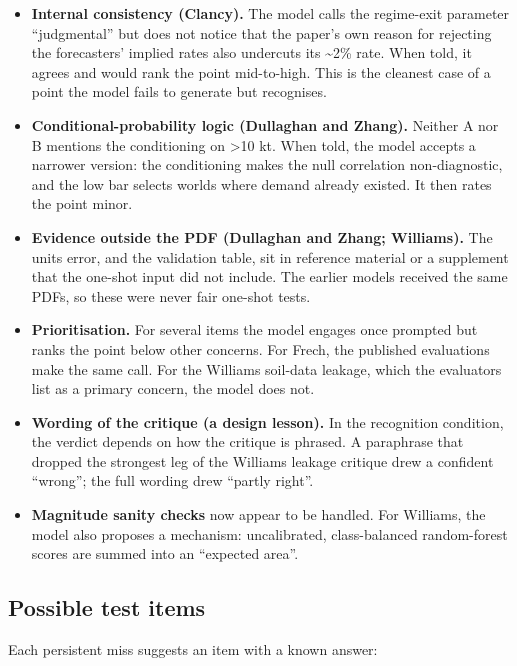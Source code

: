 \documentclass[
  11pt,
  letterpaper,
]{article}
\providecommand{\tightlist}{%
  \setlength{\itemsep}{0pt}\setlength{\parskip}{0pt}}
\begin{document}
\begin{itemize}
\tightlist
\item
  \textbf{Internal consistency (Clancy).} The model calls the
  regime-exit parameter ``judgmental'' but does not notice that the
  paper's own reason for rejecting the forecasters' implied rates also
  undercuts its \textasciitilde2\% rate. When told, it agrees and would
  rank the point mid-to-high. This is the cleanest case of a point the
  model fails to generate but recognises.
\item
  \textbf{Conditional-probability logic (Dullaghan and Zhang).} Neither
  A nor B mentions the conditioning on \textgreater10 kt. When told, the
  model accepts a narrower version: the conditioning makes the null
  correlation non-diagnostic, and the low bar selects worlds where
  demand already existed. It then rates the point minor.
\item
  \textbf{Evidence outside the PDF (Dullaghan and Zhang; Williams).} The
  units error, and the validation table, sit in reference material or a
  supplement that the one-shot input did not include. The earlier models
  received the same PDFs, so these were never fair one-shot tests.
\item
  \textbf{Prioritisation.} For several items the model engages once
  prompted but ranks the point below other concerns. For Frech, the
  published evaluations make the same call. For the Williams soil-data
  leakage, which the evaluators list as a primary concern, the model
  does not.
\item
  \textbf{Wording of the critique (a design lesson).} In the recognition
  condition, the verdict depends on how the critique is phrased. A
  paraphrase that dropped the strongest leg of the Williams leakage
  critique drew a confident ``wrong''; the full wording drew ``partly
  right''.
\item
  \textbf{Magnitude sanity checks} now appear to be handled. For
  Williams, the model also proposes a mechanism: uncalibrated,
  class-balanced random-forest scores are summed into an ``expected
  area''.
\end{itemize}

\subsection{Possible test items}\label{possible-test-items}

Each persistent miss suggests an item with a known answer:
\end{document}
